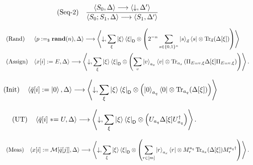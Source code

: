 \documentclass[acmsmall,screen,review,anonymous,nonacm]{acmart}
\theoremstyle{defn_style}
\newcommand{\asteq}{\mathrel{*}=}
\begin{document}
\begin{figure}[H]
\begin{minipage}[t]{0.60\textwidth}
\[\begin{array}{ll}
\text{\rm (Seq-2)}
&
\displaystyle
\frac{
\langle S_0,\Delta\rangle
\longrightarrow
\langle \downarrow,\Delta'\rangle
}{
\langle S_0;S_1,\Delta\rangle
\longrightarrow
\langle S_1,\Delta'\rangle
}
\end{array}
\]
\end{minipage}

\[
\begin{array}{ll}
\text{\rm (Rand)}
&
\displaystyle
\left\langle
p:=_{\$}\mathbf{rand}(n),\Delta
\right\rangle
\longrightarrow
\left\langle
\downarrow,
\sum_{\xi}
\ket{\xi}\bra{\xi}_{\mathsf D}
\otimes
\left(
2^{-n}
\sum_{s\in\{0,1\}^{n}}
\ket{s}_{\vec a}\bra{s}
\otimes
\operatorname{Tr}_{\vec a}(\Delta[\xi])
\right)
\right\rangle
\\[4ex]

\text{\rm (Assign)}
&
\displaystyle
\left\langle
x[i]:=E,\Delta
\right\rangle
\longrightarrow
\left\langle
\downarrow,
\sum_{\xi}
\ket{\xi}\bra{\xi}_{\mathsf D}
\otimes
\left(
\sum_v
\ket v_{a_x}\bra v
\otimes
\operatorname{Tr}_{a_x}
\left(
\Pi_{E=v,\xi}\Delta[\xi]\Pi_{E=v,\xi}
\right)
\right)
\right\rangle .
\end{array}
\]

\noindent
\begin{minipage}[t]{0.48\textwidth}
\[
\begin{aligned}
&
\text{\rm (Init)}
\quad
\left\langle
\bar q[i]:=\ket0,\Delta
\right\rangle
\longrightarrow
\left\langle
\downarrow,
\sum_{\xi}
\ket{\xi}\bra{\xi}_{\mathsf D}
\otimes
\left(
\ket0_{a_q}\bra0
\otimes
\operatorname{Tr}_{a_q}(\Delta[\xi])
\right)
\right\rangle
\end{aligned}
\]
\end{minipage}
\hfill
\begin{minipage}[t]{0.48\textwidth}
\[
\begin{aligned}
&
\text{\rm (UT)}
\quad
\left\langle
\bar q[i]\asteq U,\Delta
\right\rangle
\longrightarrow
\left\langle
\downarrow,
\sum_{\xi}
\ket{\xi}\bra{\xi}_{\mathsf D}
\otimes
\left(
U_{a_q}\Delta[\xi]U_{a_q}^{\dagger}
\right)
\right\rangle .
\end{aligned}
\]
\end{minipage}

\vspace{0.5ex}

\[
\begin{array}{ll}
\text{\rm (Meas)}
&
\displaystyle
\left\langle
x[i]:=\mathcal M[\bar q[j]],\Delta
\right\rangle
\longrightarrow
\left\langle
\downarrow,
\sum_{\xi}
\ket{\xi}\bra{\xi}_{\mathsf D}
\otimes
\left(
\sum_{r\in[m]}
\ket r_{a_x}\bra r
\otimes
M^{a_q}_r
\operatorname{Tr}_{a_x}(\Delta[\xi])
M^{a_q\dagger}_r
\right)
\right\rangle .
\end{array}
\]


\end{figure}
\end{document}
